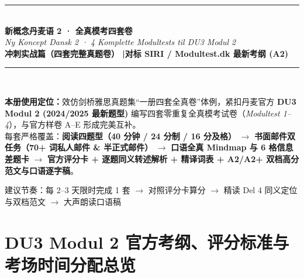 \documentclass[11pt, a4paper]{ctexart}
\begin{document}
\begin{titlepage}
  \centering
  \vspace*{2.2cm}
  {\color{NCDRed}\rule{\linewidth}{2.5pt}}\\[1.1cm]
  {\fontsize{30}{36}\selectfont\bfseries\color{NCDNavy} 新概念丹麦语 2 · 全真模考四套卷}\\[0.5cm]
  {\LARGE\itshape\color{NCDTeal} Ny Koncept Dansk 2 · 4 Komplette Modultests til DU3 Modul 2}\\[0.8cm]
  {\large\bfseries\color{NCDGray} 冲刺实战篇（四套完整真题卷） \quad|\quad 对标 SIRI / Modultest.dk 最新考纲 (A2)}\\[1.1cm]
  {\color{NCDRed}\rule{\linewidth}{2.5pt}}\\[1.8cm]

  \begin{tcolorbox}[
    colback=NCDBgBlue,
    colframe=NCDNavy,
    width=0.90\linewidth,
    arc=4pt,
    boxrule=0.8pt,
    left=14pt, right=14pt, top=12pt, bottom=12pt
  ]
    \textbf{\color{NCDNavy}本册使用定位：}效仿剑桥雅思真题集“一册四套全真卷”体例，紧扣丹麦官方 \textbf{DU3 Modul 2 (2024/2025 最新题型)} 编写四套零重复全真模考试卷（\textit{Modultest 1--4}），与官方样卷 A--E 形成完美互补。\\[4pt]
    每套严格覆盖：\textbf{阅读四题型（40 分钟 / 24 分制 / 16 分及格）} $\rightarrow$ \textbf{书面邮件双任务（70+ 词私人邮件 \& 半正式邮件）} $\rightarrow$ \textbf{口语全真 Mindmap 与 6 格信息差题卡} $\rightarrow$ \textbf{官方评分卡 + 逐题同义转述解析 + 精译词表 + A2/A2+ 双档高分范文与口语逐字稿}。
  \end{tcolorbox}

  \vfill
  {\large\color{NCDGray} 建议节奏：每 2--3 天限时完成 1 套 $\rightarrow$ 对照评分卡算分 $\rightarrow$ 精读 Del 4 同义定位与双档范文 $\rightarrow$ 大声朗读口语稿}
\end{titlepage}

\tableofcontents
\clearpage

{}
\section*{DU3 Modul 2 官方考纲、评分标准与考场时间分配总览}
\end{document}
